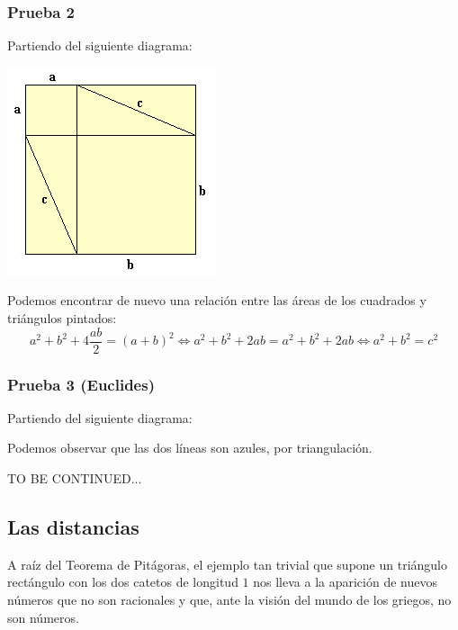 \documentclass{apuntes}
\begin{document}
\subsubsection{Prueba 2}\label{sec:Prueba2}
Partiendo del siguiente diagrama:
\begin{center}
\includegraphics[width=0.8\linewidth/2]{img/pitagoras1.png}
\end{center}

Podemos encontrar de nuevo una relación entre las áreas de los cuadrados y triángulos pintados:
\[a^2+b^2 +4\frac{ab}{2} = (a+b)^2 \iff a^2+b^2 +2ab = a^2+b^2+2ab \iff a^2+b^2=c^2\]

\subsubsection{Prueba 3 (Euclides)}\label{sec:Prueba3}
Partiendo del siguiente diagrama:
\begin{center}
\end{center}

Podemos observar que las dos líneas son azules, por triangulación.

TO BE CONTINUED...


\subsection{Las distancias}
A raíz del Teorema de Pitágoras, el ejemplo tan trivial que supone un triángulo rectángulo con los dos catetos de longitud $1$ nos lleva a la aparición de nuevos números que no son racionales y que, ante la visión del mundo de los griegos, no son números.
\end{document}
